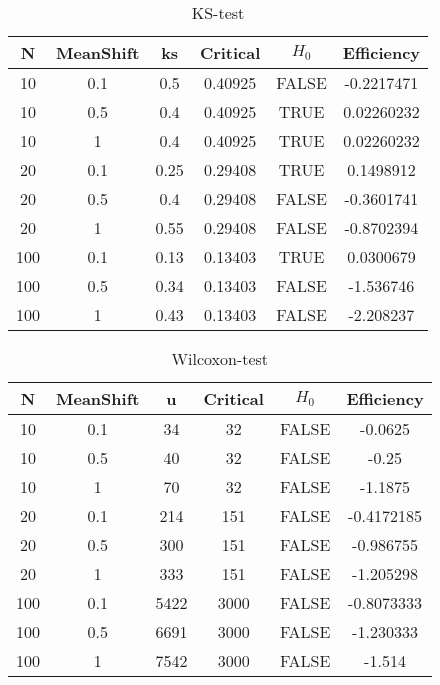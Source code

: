 \documentclass{article} %
\begin{document}
\begin{table}[H]
\centering
\begin{tabular}{|c|c|c|c|c|c|}
\hline
\textbf{N} & \textbf{MeanShift} & \textbf{ks} &
\textbf{Critical} & \textbf{$H_0$} & \textbf{Efficiency} \\ \hline
10  & 0.1       & 0.5  & 0.40925  & FALSE & -0.2217471 \\ \hline
10  & 0.5       & 0.4  & 0.40925  & TRUE  & 0.02260232 \\ \hline
10  & 1         & 0.4  & 0.40925  & TRUE  & 0.02260232 \\ \hline
20  & 0.1       & 0.25 & 0.29408  & TRUE  & 0.1498912  \\ \hline
20  & 0.5       & 0.4  & 0.29408  & FALSE & -0.3601741 \\ \hline
20  & 1         & 0.55 & 0.29408  & FALSE & -0.8702394 \\ \hline
100 & 0.1       & 0.13 & 0.13403  & TRUE  & 0.0300679  \\ \hline
100 & 0.5       & 0.34 & 0.13403  & FALSE & -1.536746  \\ \hline
100 & 1         & 0.43 & 0.13403  & FALSE & -2.208237  \\ \hline
\end{tabular}
\caption{KS-test}
\end{table}

\begin{table}[H]
\centering
\label{my-label}
\begin{tabular}{|c|c|c|c|c|c|}
\hline
\textbf{N} & \textbf{MeanShift} & \textbf{u} &
\textbf{Critical} & \textbf{$H_0$} & \textbf{Efficiency} \\ \hline
10  & 0.1       & 34   & 32       & FALSE & -0.0625    \\ \hline
10  & 0.5       & 40   & 32       & FALSE & -0.25      \\ \hline
10  & 1         & 70   & 32       & FALSE & -1.1875    \\ \hline
20  & 0.1       & 214  & 151      & FALSE & -0.4172185 \\ \hline
20  & 0.5       & 300  & 151      & FALSE & -0.986755  \\ \hline
20  & 1         & 333  & 151      & FALSE & -1.205298  \\ \hline
100 & 0.1       & 5422 & 3000     & FALSE & -0.8073333 \\ \hline
100 & 0.5       & 6691 & 3000     & FALSE & -1.230333  \\ \hline
100 & 1         & 7542 & 3000     & FALSE & -1.514     \\ \hline
\end{tabular}
\caption{Wilcoxon-test}
\end{table}
\end{document}
